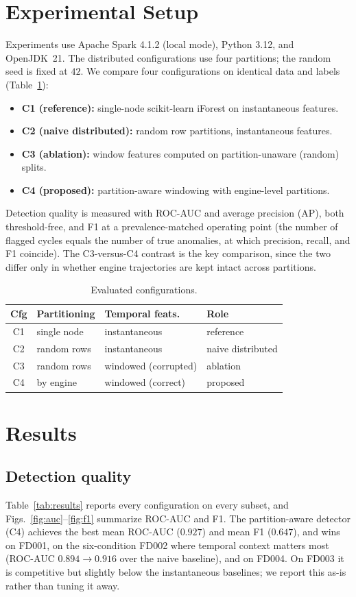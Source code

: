 \documentclass[conference]{IEEEtran}
\begin{document}
\section{Experimental Setup}
Experiments use Apache Spark 4.1.2 (local mode), Python 3.12, and OpenJDK~21. The distributed configurations use four partitions; the random seed is fixed at $42$. We compare four configurations on identical data and labels (Table~\ref{tab:cfg}):
\begin{itemize}
\item \textbf{C1 (reference):} single-node scikit-learn iForest on instantaneous features.
\item \textbf{C2 (naive distributed):} random row partitions, instantaneous features.
\item \textbf{C3 (ablation):} window features computed on partition-unaware (random) splits.
\item \textbf{C4 (proposed):} partition-aware windowing with engine-level partitions.
\end{itemize}
Detection quality is measured with ROC-AUC and average precision (AP), both threshold-free, and F1 at a prevalence-matched operating point (the number of flagged cycles equals the number of true anomalies, at which precision, recall, and F1 coincide). The C3-versus-C4 contrast is the key comparison, since the two differ only in whether engine trajectories are kept intact across partitions.

\begin{table}[t]
\caption{Evaluated configurations.}
\label{tab:cfg}
\centering
\small
\begin{tabular}{clll}
\toprule
Cfg & Partitioning & Temporal feats. & Role \\
\midrule
C1 & single node & instantaneous & reference \\
C2 & random rows & instantaneous & naive distributed \\
C3 & random rows & windowed (corrupted) & ablation \\
C4 & by engine & windowed (correct) & proposed \\
\bottomrule
\end{tabular}
\end{table}

\section{Results}
\subsection{Detection quality}
Table~\ref{tab:results} reports every configuration on every subset, and Figs.~\ref{fig:auc}--\ref{fig:f1} summarize ROC-AUC and F1. The partition-aware detector (C4) achieves the best mean ROC-AUC ($0.927$) and mean F1 ($0.647$), and wins on FD001, on the six-condition FD002 where temporal context matters most (ROC-AUC $0.894 \rightarrow 0.916$ over the naive baseline), and on FD004. On FD003 it is competitive but slightly below the instantaneous baselines; we report this as-is rather than tuning it away.
\end{document}
